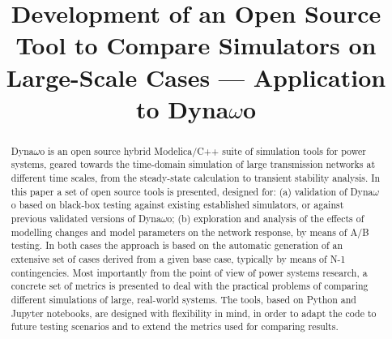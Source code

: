 \documentclass[conference]{IEEEtran}
\begin{document}

\title{Development of an Open Source Tool to Compare Simulators on
  Large-Scale Cases --- Application to Dyna$\omega$o}

\author{
}

\maketitle

\begin{abstract}
  Dyna$\omega$o is an open source hybrid Modelica/C++ suite of simulation tools for
  power systems, geared towards the time-domain simulation of large transmission
  networks at different time scales, from the steady-state calculation to
  transient stability analysis. In this paper a set of open source
  tools is presented, designed for: (a) validation of Dyna$\omega$o based on black-box testing
  against existing established simulators, or against previous validated
  versions of Dyna$\omega$o; (b) exploration and analysis of the effects of modelling
  changes and model parameters on the network response, by means of A/B
  testing. In both cases the approach is based on the automatic generation of an
  extensive set of cases derived from a given base case, typically by means of
  N-1 contingencies. Most importantly from the point of view of power systems
  research, a concrete set of metrics is presented to deal with the
  practical problems of comparing different simulations of large, real-world
  systems. The tools, based on Python and Jupyter notebooks, are designed with
  flexibility in mind, in order to adapt the code to future testing scenarios
  and to extend the metrics used for comparing results.
\end{abstract}
\end{document}
